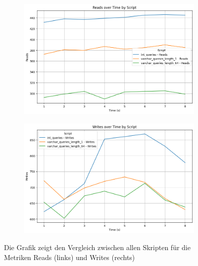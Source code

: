 \begin{figure}[!ht]
    \centering
    \begin{subfigure}[t]{0.48\textwidth}
        \centering
        \includegraphics[width=\textwidth]{PNGs/Join_Type/Reads}
        \label{join-typ-reads}
    \end{subfigure}
    \hfill
    \begin{subfigure}[t]{0.48\textwidth}
        \centering
        \includegraphics[width=\textwidth]{PNGs/Join_Type/Writes}
        \label{join-typ-writes}
    \end{subfigure}
    \caption[Join-Typ: Metrikvergleich]{Die Grafik zeigt den Vergleich zwischen allen Skripten für die Metriken Reads (links) und Writes (rechts)}
    \label{fig:join-typ-comp-metric}
\end{figure}

